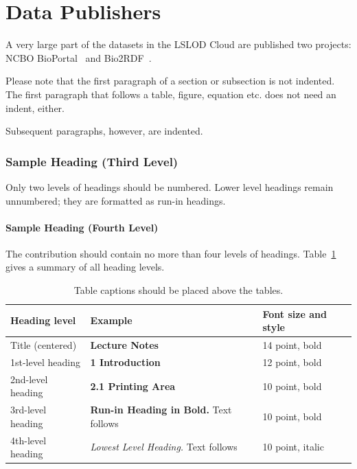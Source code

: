 \documentclass[runningheads]{llncs}
\begin{document}
    \section{Data Publishers}
    A very large part of the datasets in the LSLOD Cloud are published two projects:
    NCBO BioPortal~\citep{BioPortal} and Bio2RDF~\citep{Bio2RDF}.


    Please note that the first paragraph of a section or subsection is
    not indented.
    The first paragraph that follows a table, figure,
    equation etc. does not need an indent, either.

    Subsequent paragraphs, however, are indented.

    \subsubsection{Sample Heading (Third Level)} Only two levels of
    headings should be numbered. Lower level headings remain unnumbered;
    they are formatted as run-in headings.

    \paragraph{Sample Heading (Fourth Level)}
    The contribution should contain no more than four levels of
    headings. Table~\ref{tab1} gives a summary of all heading levels.

    \begin{table}
        \caption{Table captions should be placed above the
        tables.}\label{tab1}
        \begin{tabular}{|l|l|l|}
            \hline
            Heading level     & Example                                          & Font size and style \\
            \hline
            Title (centered)  & {\Large\bfseries Lecture Notes}                  & 14 point, bold      \\
            1st-level heading & {\large\bfseries 1 Introduction}                 & 12 point, bold      \\
            2nd-level heading & {\bfseries 2.1 Printing Area}                    & 10 point, bold      \\
            3rd-level heading & {\bfseries Run-in Heading in Bold.} Text follows & 10 point, bold      \\
            4th-level heading & {\itshape Lowest Level Heading.} Text follows    & 10 point, italic    \\
            \hline
        \end{tabular}
    \end{table}
\end{document}
